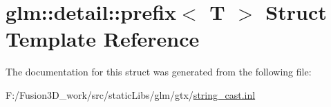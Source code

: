 \hypertarget{structglm_1_1detail_1_1prefix}{}\section{glm\+:\+:detail\+:\+:prefix$<$ T $>$ Struct Template Reference}
\label{structglm_1_1detail_1_1prefix}


The documentation for this struct was generated from the following file\+:\begin{DoxyCompactItemize}
\item 
F\+:/\+Fusion3\+D\+\_\+work/src/static\+Libs/glm/gtx/\hyperlink{string__cast_8inl}{string\+\_\+cast.\+inl}\end{DoxyCompactItemize}
